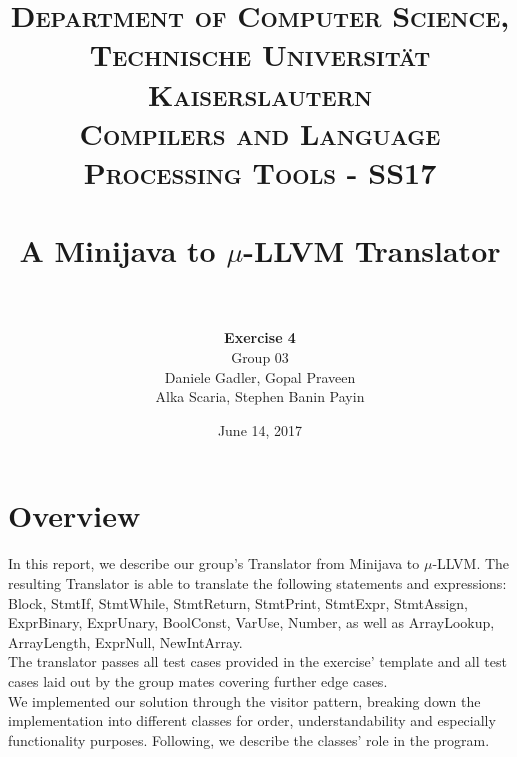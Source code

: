 \documentclass[paper=a4, fontsize=11pt]{scrartcl}
\title{
		\usefont{OT1}{bch}{b}{n}
		\normalfont \normalsize \textsc{Department of Computer Science, Technische Universit\"at Kaiserslautern\\
Compilers and Language Processing Tools - SS17
		} \\ [2pt]
		\horrule{0.5pt} \\[0.4cm]
		\huge A Minijava to $\mu$-LLVM Translator\\
		\horrule{2pt} \\[0.5cm]
}
\author{	
		\textbf{Exercise 4}\\
		Group 03\\
        Daniele Gadler, Gopal Praveen\\Alka Scaria, Stephen Banin Payin \\[-1pt]		\normalsize
}
\date{June 14, 2017}
\numberwithin{equation}{section}		%
\numberwithin{figure}{section}			%
\numberwithin{table}{section}				%
\begin{document}
\maketitle

\section*{Overview}
In this report, we describe our group's Translator from Minijava to $\mu$-LLVM. The resulting Translator is able to translate the following statements and expressions: Block, StmtIf, StmtWhile, StmtReturn, StmtPrint, StmtExpr, StmtAssign, ExprBinary, ExprUnary, BoolConst, VarUse, Number, as well as ArrayLookup, ArrayLength, ExprNull, NewIntArray. \\
The translator passes all test cases provided in the exercise' template and all test cases laid out by the group mates covering further edge cases. \\
We implemented our solution through the visitor pattern, breaking down the implementation into different classes for order, understandability and especially functionality purposes. Following, we describe the classes' role in the program. 
\end{document}
